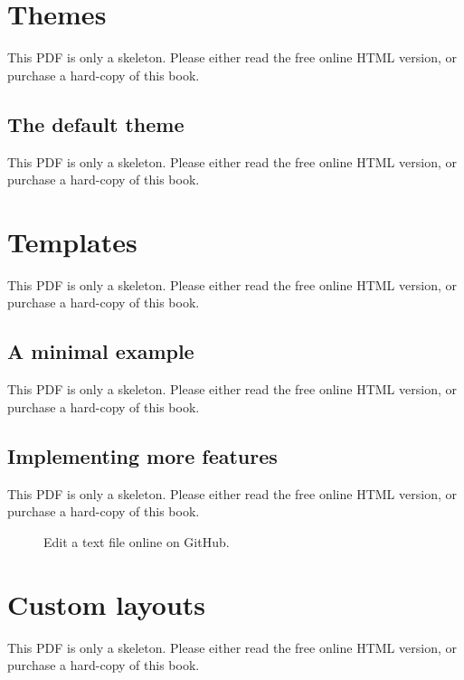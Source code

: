 \documentclass[
  12pt,
]{krantz}
\begin{document}
\section{Themes}\label{themes}

This PDF is only a skeleton. Please either read the free online HTML version, or purchase a hard-copy of this book.

\subsection{The default theme}\label{the-default-theme}

This PDF is only a skeleton. Please either read the free online HTML version, or purchase a hard-copy of this book.

\section{Templates}\label{templates}

This PDF is only a skeleton. Please either read the free online HTML version, or purchase a hard-copy of this book.

\subsection{A minimal example}\label{a-minimal-example}

This PDF is only a skeleton. Please either read the free online HTML version, or purchase a hard-copy of this book.

\subsection{Implementing more features}\label{how-to}

This PDF is only a skeleton. Please either read the free online HTML version, or purchase a hard-copy of this book.

\begin{figure}\caption{Edit a text file online on GitHub.}\end{figure}

\section{Custom layouts}\label{custom-layouts}

This PDF is only a skeleton. Please either read the free online HTML version, or purchase a hard-copy of this book.
\end{document}

